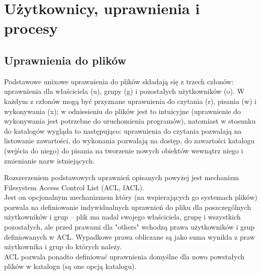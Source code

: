 % 
% 
% 
% 

\section{Użytkownicy, uprawnienia i procesy}


\subsection{Uprawnienia do plików}
Podstawowe unixowe uprawnienia do plików składają się z trzech członów: uprawnienia dla właściciela (u), grupy (g) i pozostałych użytkowników (o).
W każdym z członów mogą być przyznane uprawnienia do czytania (r), pisania (w) i wykonywania (x); w odniesieniu do plików jest to intuicyjne (uprawnienie do wykonywania jest potrzebne do uruchomienia programów), natomiast w stosunku do katalogów wygląda to następująco: uprawnienia do czytania pozwalają na listowanie zawartości, do wykonania pozwalają na dostęp, do zawartości katalogu (wejścia do niego) do pisania na tworzenie nowych obiektów wewnątrz niego i zmienianie nazw istniejących.

Rozszerzeniem podstawowych uprawnień opisanych powyżej jest mechanizm Filesystem Access Control List (ACL, fACL).\\
Jest on opcjonalnym mechanizmem który (na wspierających go systemach plików) pozwala na definiowanie indywidualnych uprawnień do pliku dla poszczególnych użytkowników i grup – plik ma nadal swojego właściciela, grupę i wszystkich pozostałych, ale przed prawami dla "others" wchodzą prawa użytkowników i grup definiowanych w ACL. Wypadkowe prawa obliczane są jako suma wynikła z praw użytkownika i grup do których należy.\\
ACL pozwala ponadto definiować uprawnienia domyślne dla nowo powstałych plików w katalogu (są one opcją katalogu).

